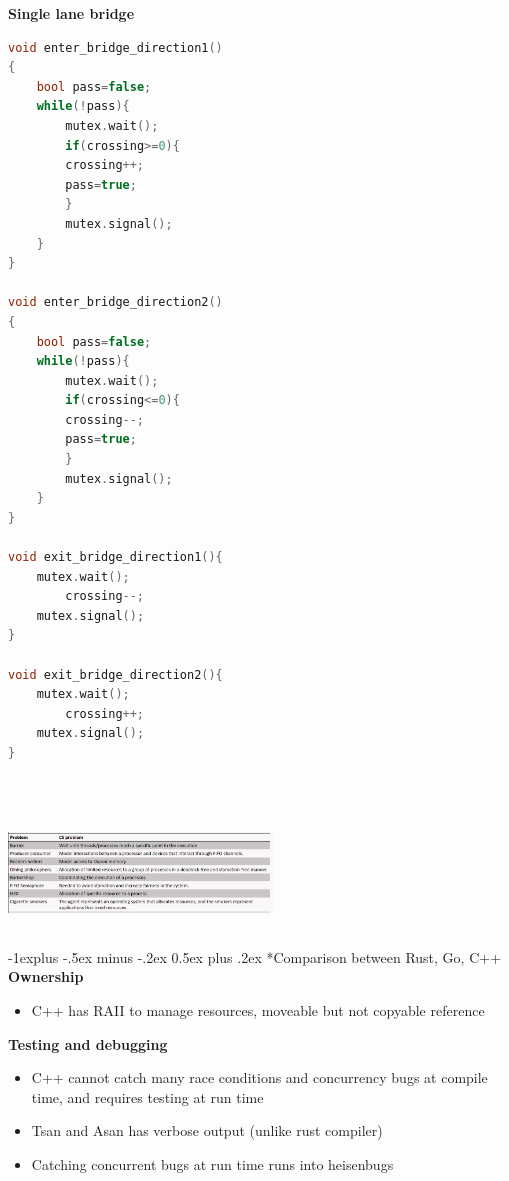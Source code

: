 \documentclass[10pt, landscape]{article}
\makeatletter
\renewcommand{\subsection}{\@startsection{subsection}{2}{0mm}%
                                {-1explus -.5ex minus -.2ex}%
                                {0.5ex plus .2ex}%
                                {\normalfont\normalsize\bfseries}}
\makeatother
\begin{document}
\begin{multicols}{4}
\textbf{Single lane bridge} \\
\begin{lstlisting}[language=c++,breaklines=true, breakatwhitespace=true]
void enter_bridge_direction1()
{   
    bool pass=false;   
    while(!pass){      
        mutex.wait();   		
        if(crossing>=0){
        crossing++;     			    
        pass=true;      
        }       
        mutex.signal();   
    }
} 

void enter_bridge_direction2()
{   
	bool pass=false;   
	while(!pass){      
		mutex.wait();   		
        if(crossing<=0){
        crossing--; 
        pass=true;      
		}       
		mutex.signal();   
	}
} 

void exit_bridge_direction1(){    	
    mutex.wait();    
	    crossing--;    	
    mutex.signal(); 
} 

void exit_bridge_direction2(){    	
    mutex.wait();    
	    crossing++;    	
    mutex.signal(); 
} 

    
\end{lstlisting}

\includegraphics*[width=7cm, height=3cm]{classicalSummary.png}

\subsection*{Comparison between Rust, Go, C++}
\textbf{Ownership} \\ 
\begin{itemize}
    \item C++ has RAII to manage resources, moveable but not copyable reference
\end{itemize}

\textbf{Testing and debugging} \\
\begin{itemize}
    \item C++ cannot catch many race conditions and concurrency bugs at compile time, and requires testing at run time 
    \item Tsan and Asan has verbose output (unlike rust compiler)
    \item Catching concurrent bugs at run time runs into heisenbugs
\end{itemize}


\end{multicols}
\end{document}
